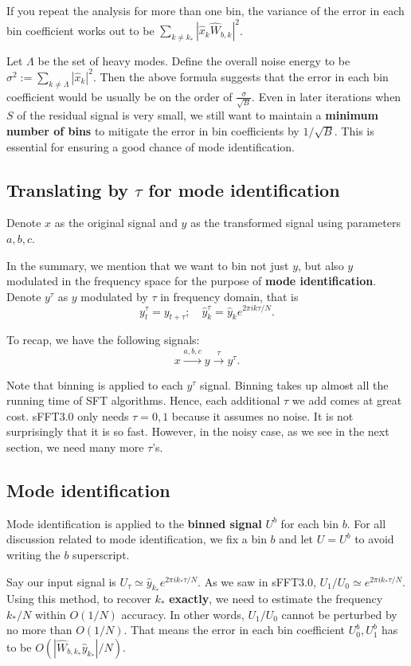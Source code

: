 \documentclass[10pt]{article}
\begin{document}
If you repeat the analysis for more than one bin, the variance of the error in each bin coefficient works out to be $\sum_{k\neq k_*} |\hat{x}_k \hat{W}_{b,k}|^2$.

Let $\Lambda$ be the set of heavy modes. Define the overall noise energy to be $\sigma^2 := \sum_{k\neq \Lambda} |\hat{x}_k|^2$. Then the above formula suggests that the error in each bin coefficient would be usually be on the order of $\frac{\sigma}{\sqrt{B}}$. Even in later iterations when $S$ of the residual signal is very small, we still want to maintain a \textbf{minimum number of bins} to mitigate the error in bin coefficients by $1/\sqrt{B}$. This is essential for ensuring a good chance of mode identification.

\subsection{Translating by $\tau$ for mode identification}

Denote $x$ as the original signal and $y$ as the transformed signal using parameters $a,b,c$.

In the summary, we mention that we want to bin not just $y$, but also $y$ modulated in the frequency space for the purpose of \textbf{mode identification}. Denote $y^{\tau}$ as $y$ modulated by $\tau$ in frequency domain, that is
$$y^{\tau}_{t} = y_{t+\tau}; \quad \hat{y}^{\tau}_k = \hat{y}_k e^{2\pi i k \tau/N}.$$

To recap, we have the following signals:
$$x \xrightarrow{a,b,c} y \xrightarrow{\tau} y^{\tau}.$$

Note that binning is applied to each $y^{\tau}$ signal. Binning takes up almost all the running time of SFT algorithms. Hence, each additional $\tau$ we add comes at great cost. sFFT3.0 only needs $\tau=0,1$ because it assumes no noise. It is not surprisingly that it is so fast. However, in the noisy case, as we see in the next section, we need many more $\tau$'s.

\subsection{Mode identification}

Mode identification is applied to the \textbf{binned signal} $U^b$ for each bin $b$. For all discussion related to mode identification, we fix a bin $b$ and let $U=U^b$ to avoid writing the $b$ superscript.

Say our input signal is $U_{\tau} \simeq \hat{y}_{k_*} e^{2\pi i k_* \tau/N}$. As we saw in sFFT3.0, $U_1/U_0 \simeq e^{2\pi i k_* \tau/N}$. Using this method, to recover $k_*$ \textbf{exactly}, we need to estimate the frequency $k_*/N$ within $O(1/N)$ accuracy. In other words, $U_1/U_0$ cannot be perturbed by no more than $O(1/N)$. That means the error in each bin coefficient $U_0^b,U_1^b$ has to be $O(|\hat{W}_{b,k_*}\hat{y}_{k_*}|/N)$.
\end{document}
